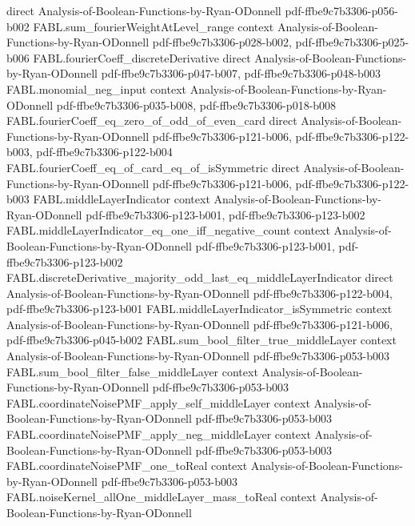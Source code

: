 \begin{theorem}
  {direct}
  {Analysis-of-Boolean-Functions-by-Ryan-ODonnell}
  {pdf-ffbe9c7b3306-p056-b002}
\proofstep
  {FABL.sum_fourierWeightAtLevel_range}
  {context}
  {Analysis-of-Boolean-Functions-by-Ryan-ODonnell}
  {pdf-ffbe9c7b3306-p028-b002,
    pdf-ffbe9c7b3306-p025-b006}
\proofstep
  {FABL.fourierCoeff_discreteDerivative}
  {direct}
  {Analysis-of-Boolean-Functions-by-Ryan-ODonnell}
  {pdf-ffbe9c7b3306-p047-b007,
    pdf-ffbe9c7b3306-p048-b003}
\proofstep
  {FABL.monomial_neg_input}
  {context}
  {Analysis-of-Boolean-Functions-by-Ryan-ODonnell}
  {pdf-ffbe9c7b3306-p035-b008,
    pdf-ffbe9c7b3306-p018-b008}
\proofstep
  {FABL.fourierCoeff_eq_zero_of_odd_of_even_card}
  {direct}
  {Analysis-of-Boolean-Functions-by-Ryan-ODonnell}
  {pdf-ffbe9c7b3306-p121-b006,
    pdf-ffbe9c7b3306-p122-b003,
    pdf-ffbe9c7b3306-p122-b004}
\proofstep
  {FABL.fourierCoeff_eq_of_card_eq_of_isSymmetric}
  {direct}
  {Analysis-of-Boolean-Functions-by-Ryan-ODonnell}
  {pdf-ffbe9c7b3306-p121-b006,
    pdf-ffbe9c7b3306-p122-b003}
\proofstep
  {FABL.middleLayerIndicator}
  {context}
  {Analysis-of-Boolean-Functions-by-Ryan-ODonnell}
  {pdf-ffbe9c7b3306-p123-b001,
    pdf-ffbe9c7b3306-p123-b002}
\proofstep
  {FABL.middleLayerIndicator_eq_one_iff_negative_count}
  {context}
  {Analysis-of-Boolean-Functions-by-Ryan-ODonnell}
  {pdf-ffbe9c7b3306-p123-b001,
    pdf-ffbe9c7b3306-p123-b002}
\proofstep
  {FABL.discreteDerivative_majority_odd_last_eq_middleLayerIndicator}
  {direct}
  {Analysis-of-Boolean-Functions-by-Ryan-ODonnell}
  {pdf-ffbe9c7b3306-p122-b004,
    pdf-ffbe9c7b3306-p123-b001}
\proofstep
  {FABL.middleLayerIndicator_isSymmetric}
  {context}
  {Analysis-of-Boolean-Functions-by-Ryan-ODonnell}
  {pdf-ffbe9c7b3306-p121-b006,
    pdf-ffbe9c7b3306-p045-b002}
\proofstep
  {FABL.sum_bool_filter_true_middleLayer}
  {context}
  {Analysis-of-Boolean-Functions-by-Ryan-ODonnell}
  {pdf-ffbe9c7b3306-p053-b003}
\proofstep
  {FABL.sum_bool_filter_false_middleLayer}
  {context}
  {Analysis-of-Boolean-Functions-by-Ryan-ODonnell}
  {pdf-ffbe9c7b3306-p053-b003}
\proofstep
  {FABL.coordinateNoisePMF_apply_self_middleLayer}
  {context}
  {Analysis-of-Boolean-Functions-by-Ryan-ODonnell}
  {pdf-ffbe9c7b3306-p053-b003}
\proofstep
  {FABL.coordinateNoisePMF_apply_neg_middleLayer}
  {context}
  {Analysis-of-Boolean-Functions-by-Ryan-ODonnell}
  {pdf-ffbe9c7b3306-p053-b003}
\proofstep
  {FABL.coordinateNoisePMF_one_toReal}
  {context}
  {Analysis-of-Boolean-Functions-by-Ryan-ODonnell}
  {pdf-ffbe9c7b3306-p053-b003}
\proofstep
  {FABL.noiseKernel_allOne_middleLayer_mass_toReal}
  {context}
  {Analysis-of-Boolean-Functions-by-Ryan-ODonnell}

\end{theorem}
